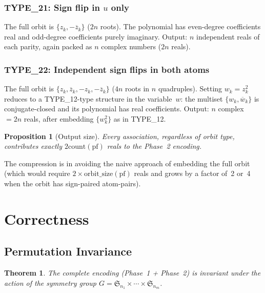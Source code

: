 \documentclass[11pt,a4paper]{article}
\theoremstyle{definition}
\theoremstyle{plain}
\newtheorem{theorem}[definition]{Theorem}
\newtheorem{proposition}[definition]{Proposition}
\theoremstyle{remark}
\newcommand{\Sym}{\mathfrak{S}}
\newcommand{\pf}{\mathrm{pf}}
\newcommand{\acount}{\mathrm{count}}
\begin{document}
\subsubsection{TYPE\_21: Sign flip in $u$ only}
The full orbit is $\{z_k, -\overline{z}_k\}$ ($2n$ roots).  The polynomial has
even-degree coefficients real and odd-degree coefficients purely imaginary.
Output: $n$ independent reals of each parity, again packed as $n$ complex
numbers ($2n$ reals).

\subsubsection{TYPE\_22: Independent sign flips in both atoms}
The full orbit is $\{z_k, \overline{z}_k, -z_k, -\overline{z}_k\}$ ($4n$
roots in $n$ quadruples).  Setting $w_k = z_k^2$ reduces to a TYPE\_12-type
structure in the variable~$w$: the multiset $\{w_k, \overline{w}_k\}$ is
conjugate-closed and its polynomial has real coefficients.  Output: $n$ complex
$= 2n$ reals, after embedding $\{w_k^2\}$ as in TYPE\_12.

\begin{proposition}[Output size]\label{prop:assoc-size}
Every association, regardless of orbit type, contributes exactly
$2\acount(\pf)$ reals to the Phase~2 encoding.
\end{proposition}

The compression is in avoiding the naive approach of embedding the full orbit
(which would require $2 \times \mathrm{orbit\_size}(\pf)$ reals and grows by a
factor of~2 or~4 when the orbit has sign-paired atom-pairs).

\section{Correctness}

\subsection{Permutation Invariance}

\begin{theorem}
The complete encoding (Phase~1 + Phase~2) is invariant under the action of the
symmetry group $G = \Sym_{n_1} \times \cdots \times \Sym_{n_m}$.
\end{theorem}
\end{document}
